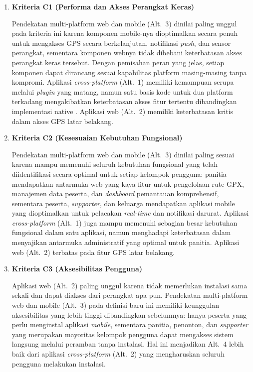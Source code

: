 \begin{enumerate}
    \item \textbf{Kriteria C1 (Performa dan Akses Perangkat Keras)}

    Pendekatan multi-platform web dan mobile (Alt.~3) dinilai paling unggul pada kriteria ini karena komponen mobile-nya dioptimalkan secara penuh untuk mengakses GPS secara berkelanjutan, notifikasi \textit{push}, dan sensor perangkat, sementara komponen webnya tidak dibebani keterbatasan akses perangkat keras tersebut. Dengan pemisahan peran yang jelas, setiap komponen dapat dirancang sesuai kapabilitas platform masing-masing tanpa kompromi. Aplikasi \textit{cross-platform} (Alt.~1) memiliki kemampuan serupa melalui \textit{plugin} yang matang, namun satu basis kode untuk dua platform terkadang mengakibatkan keterbatasan akses fitur tertentu dibandingkan implementasi native \cite{Nawrocki2021}. Aplikasi web (Alt.~2) memiliki keterbatasan kritis dalam akses GPS latar belakang.

    

    \item \textbf{Kriteria C2 (Kesesuaian Kebutuhan Fungsional)}

    Pendekatan multi-platform web dan mobile (Alt.~3) dinilai paling sesuai karena mampu memenuhi seluruh kebutuhan fungsional yang telah diidentifikasi secara optimal untuk setiap kelompok pengguna: panitia mendapatkan antarmuka web yang kaya fitur untuk pengelolaan rute GPX, manajemen data peserta, dan \textit{dashboard} pemantauan komprehensif, sementara peserta, \textit{supporter}, dan keluarga mendapatkan aplikasi mobile yang dioptimalkan untuk pelacakan \textit{real-time} dan notifikasi darurat. Aplikasi \textit{cross-platform} (Alt.~1) juga mampu memenuhi sebagian besar kebutuhan fungsional dalam satu aplikasi, namun menghadapi keterbatasan dalam menyajikan antarmuka administratif yang optimal untuk panitia. Aplikasi web (Alt.~2) terbatas pada fitur GPS latar belakang.

    

    \item \textbf{Kriteria C3 (Aksesibilitas Pengguna)}

    Aplikasi web (Alt.~2) paling unggul karena tidak memerlukan instalasi sama sekali dan dapat diakses dari perangkat apa pun. Pendekatan multi-platform web dan mobile (Alt.~3) pada definisi baru ini memiliki keunggulan aksesibilitas yang lebih tinggi dibandingkan sebelumnya: hanya peserta yang perlu menginstal aplikasi \textit{mobile}, sementara panitia, penonton, dan \textit{supporter} yang merupakan mayoritas kelompok pengguna dapat mengakses sistem langsung melalui peramban tanpa instalasi. Hal ini menjadikan Alt.~4 lebih baik dari aplikasi \textit{cross-platform} (Alt.~2) yang mengharuskan seluruh pengguna melakukan instalasi. 


\end{enumerate}
